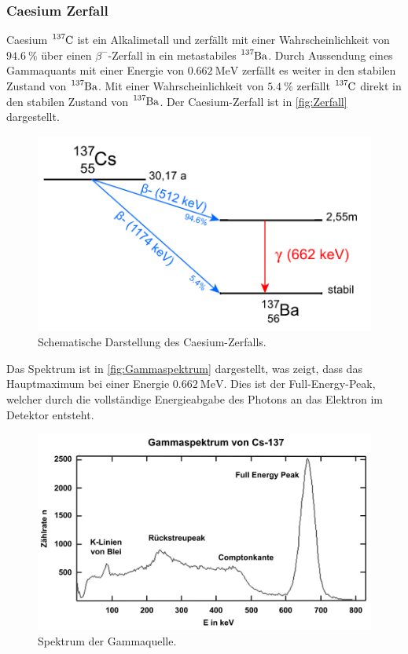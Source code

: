 \subsubsection{Caesium Zerfall}
\label{subsubsec:Caesium}
Caesium $\ce{^{137}C}$ ist ein Alkalimetall und zerfällt mit einer Wahrscheinlichkeit von $\qty{94.6}{\percent}$ über einen $\beta^-$-Zerfall
in ein metastabiles $\ce{^{137}Ba}$.
Durch Aussendung eines Gammaquants mit einer Energie von $\qty{0.662}{\mega\eV}$ zerfällt es weiter in den stabilen Zustand von $\ce{^{137}Ba}$.
Mit einer Wahrscheinlichkeit von $\qty{5.4}{\percent}$ zerfällt $\ce{^{137}C}$ direkt in den stabilen Zustand von $\ce{^{137}Ba}$.
Der Caesium-Zerfall ist in \autoref{fig:Zerfall} dargestellt.
\begin{figure}[H]
    \centering
    \includegraphics[scale=0.7]{Abbildungen/Caesiumzerfall.png}
    \caption{Schematische Darstellung des Caesium-Zerfalls.\cite{Gammaspektrum}}
    \label{fig:Gammaspektrum}
\end{figure}

Das Spektrum ist in \autoref{fig:Gammaspektrum} dargestellt, was zeigt, dass das Hauptmaximum bei einer Energie
$\qty{0.662}{\mega\eV}$. Dies ist der Full-Energy-Peak, welcher durch die vollständige Energieabgabe des Photons an das Elektron im Detektor
entsteht.

\begin{figure}[H]
    \centering
    \includegraphics[scale=0.7]{Abbildungen/Gammaspektrum.png}
    \caption{Spektrum der Gammaquelle.\cite{Gammaspektrum}}
    \label{fig:Gammaspektrum}
\end{figure}

